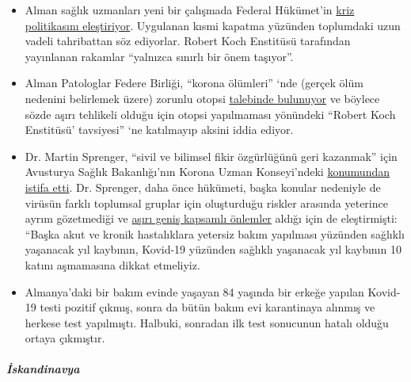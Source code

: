 \begin{itemize}
\tightlist
\item
  Alman sağlık uzmanları yeni bir çalışmada Federal Hükümet'in
  \href{https://www.tagesschau.de/investigativ/ndr-wdr/corona-experten-thesenpapier-101.html}{kriz
  politikasını eleştiriyor}. Uygulanan kısmi kapatma yüzünden toplumdaki
  uzun vadeli tahribattan söz ediyorlar. Robert Koch Enstitüsü
  tarafından yayınlanan rakamlar ``yalnızca sınırlı bir önem taşıyor''.
\item
  Alman Patologlar Federe Birliği, ``korona ölümleri'' `nde (gerçek ölüm
  nedenini belirlemek üzere) zorunlu otopsi
  \href{https://www.pathologie-dgp.de/die-dgp/aktuelles/meldung/pressemitteilung-an-corona-verstorbene-sollten-obduziert-werden/}{talebinde
  bulunuyor} ve böylece sözde aşırı tehlikeli olduğu için otopsi
  yapılmaması yönündeki ``Robert Koch Enstitüsü' tavsiyesi'' `ne
  katılmayıp aksini iddia ediyor.
\item
  Dr. Martin Sprenger, ``sivil ve bilimsel fikir özgürlüğünü geri
  kazanmak'' için Avusturya Sağlık Bakanlığı'nın Korona Uzman
  Konseyi'ndeki
  \href{https://mailchi.mp/addendum/fles-home-office-260342}{konumundan
  istifa etti}. Dr. Sprenger, daha önce hükümeti, başka konular
  nedeniyle de virüsün farklı toplumsal gruplar için oluşturduğu riskler
  arasında yeterince ayrım gözetmediği ve
  \href{https://www.addendum.org/coronavirus/interview-sprenger/}{aşırı
  geniş kapsamlı önlemler} aldığı için de eleştirmişti: ``Başka akut ve
  kronik hastalıklara yetersiz bakım yapılması yüzünden sağlıklı
  yaşanacak yıl kaybının, Kovid-19 yüzünden sağlıklı yaşanacak yıl
  kaybının 10 katını aşmamasına dikkat etmeliyiz.
\item
  Almanya'daki bir bakım evinde yaşayan 84 yaşında bir erkeğe yapılan
  Kovid-19 testi pozitif çıkmış, sonra da bütün bakım evi karantinaya
  alınmış ve herkese test yapılmıştı. Halbuki, sonradan ilk test
  sonucunun hatalı olduğu ortaya çıkmıştır.
\end{itemize}

\hypertarget{iskandinavya}{%
\subparagraph{\texorpdfstring{\textbf{İskandinavya}}{İskandinavya}}\label{iskandinavya}}


